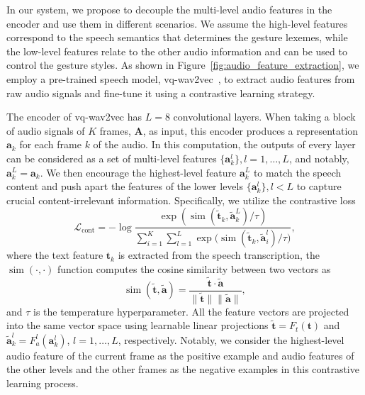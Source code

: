 \documentclass[acmtog,authorversion]{acmart}
\newcommand{\vect}[1]{\bm{#1}}
\newcommand{\tildevect}[1]{\vect{\tilde{#1}}}
\newcommand{\eqword}[1]{{\text{#1}}}
\DeclareMathOperator*{\simloss}{sim}
\newcommand{\norm}[1]{\lVert #1 \rVert}
\newcommand{\fig}{Figure{}~}
\begin{document}
In our system, we propose to decouple the multi-level audio features in the encoder and use them in different scenarios. We assume the high-level features correspond to the speech semantics that determines the gesture lexemes, while the low-level features relate to the other audio information and can be used to control the {gesture styles}. As shown in \fig\ref{fig:audio_feature_extraction}, we employ a pre-trained speech model, {vq-wav2vec}~\cite{baevski2020vq-wav2vec}, to extract audio features from raw audio signals and fine-tune it using a contrastive learning strategy.

The encoder of vq-wav2vec has $L=8$ convolutional layers. When taking a block of audio signals of $K$ frames, $\vect{A}$, as input, this encoder produces a representation $\vect{a}_k$ for each frame $k$ of the audio. In this computation, the outputs of every layer can be considered as a set of multi-level features $\{\vect{a}_k^{l}\}, {l=1,\dots,L}$, and notably, $\vect{a}_k^{L}=\vect{a}_k$. We then encourage the highest-level feature $\vect{a}_k^{L}$ to match the speech content and push apart the features of the lower levels $\{\vect{a}_k^{l}\}, l<L$ to capture crucial content-irrelevant information. Specifically, we utilize the contrastive loss
\begin{equation}
    \mathcal{L}_{\eqword{cont}} = -\log{\frac{\exp{(\simloss(\tildevect{t}_{k}, \tildevect{a}^{L}_{k})/\tau)}}{\sum^{K}_{i=1}\sum_{l=1}^{L}\exp{(\simloss(\tildevect{t}_k, \tildevect{a}^{l}_{i})}/\tau)}},
\end{equation}
where the text feature $\vect{t}_k$ is extracted from the speech transcription, the $\simloss(\cdot,\cdot)$ function computes the cosine similarity between two vectors as
\begin{equation}
    \simloss(\tildevect{t},\tildevect{a})=\frac{\tildevect{t} \cdot \tildevect{a}}{\norm{\tildevect{t}}\norm{\tildevect{a}}},
\end{equation}
and $\tau$ is the temperature hyperparameter. All the feature vectors are projected into the same vector space using learnable linear projections $\tildevect{t}=F_t(\vect{t})$ and $\tildevect{a}_k^l=F_a^l(\vect{a}_k^l)$, $l=1,\dots,L$, respectively. Notably, we consider the highest-level audio feature of the current frame as the positive example and audio features of the other levels and the other frames as the negative examples in this contrastive learning process.
\end{document}
